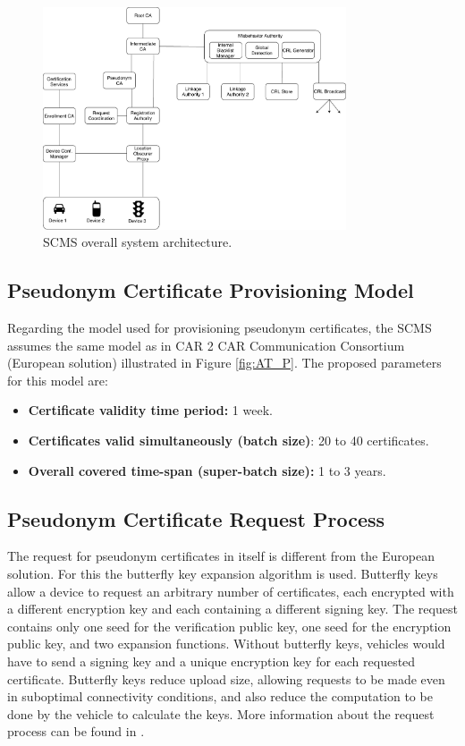 \begin{figure}
	\centering
	\includegraphics[width=0.8\textwidth]{Figures/SCMS_PKI.pdf}
	\caption{\label{fig:SCMS_PKI}SCMS overall system architecture.}
\end{figure}

\subsection{Pseudonym Certificate Provisioning Model}
\bigbreak
Regarding the model used for provisioning pseudonym certificates, the SCMS assumes the same model as in CAR 2 CAR Communication
Consortium \cite{generic_eu} (European solution) illustrated in Figure \ref{fig:AT_P}. The proposed parameters for this model are:
\begin{itemize}
	\item \textbf{Certificate validity time period:} 1 week.
	\item \textbf{Certificates valid simultaneously (batch size)}: 20 to 40 certificates.
	\item \textbf{Overall covered time-span (super-batch size):} 1 to 3 years.
\end{itemize}

\subsection{Pseudonym Certificate Request Process}

The request for pseudonym certificates in itself is different from the European solution. For this the
butterfly key expansion algorithm \cite{scms} is used. Butterfly keys allow a device to request an arbitrary number of certificates, each encrypted with a different encryption key and each containing a different signing key. The request contains only one seed for the verification public key, one seed for the encryption public key, and two expansion functions. Without butterfly keys, vehicles would have to send a signing key and a unique encryption key for each requested certificate. Butterfly keys reduce upload size, allowing requests to be made even in suboptimal connectivity conditions, and also reduce the computation to be done by the vehicle to calculate the keys. More information about the request process can be found in \cite{scms}.



